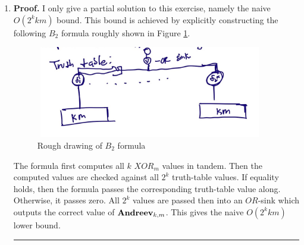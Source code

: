 \documentclass[12pt]{article}%
\newenvironment{proof}[1][Proof]{\textbf{#1.} }{\ \rule{0.5em}{0.5em}}
\begin{document}
\begin{enumerate}
\begin{proof}
\begin{gather*}
  \begin{split}
      \mathcal{L}_{B_2}({\bf Andreev}_{k,m}) & \geq  \frac{1}{4} \sum_{i=1}^{2^k/k} \log |\text{sub}_{V_i}(f)| + \frac{1}{4}\log |\text{sub}_{V_1}(f)| \\
      & \geq \frac{1}{4} \sum_{i=1}^{2^k/k} \log 2^{2^k} + \frac{1}{4}\log 2^k
      =  \frac{2^k2^k}{4k} + \frac{k}{4} = \Omega(n^2/\log n)
  \end{split}
  \end{gather*}
\end{proof}
%
\item
\begin{proof}
  I only give a partial solution to this exercise, namely the naive $O(2^kkm)$ bound. This bound is achieved by explicitly constructing the following $B_2$ formula roughly shown in Figure \ref{fig:cir1}.

  \begin{figure}
    \centering
    \includegraphics[width=10cm, height=4cm]{./Page4.jpeg}
    \caption{Rough drawing of $B_2$ formula}
    \label{fig:cir1}
  \end{figure}
  The formula first computes all $k$ $XOR_m$ values in tandem. Then the computed values are checked against all $2^k$ truth-table values. If equality holds, then the formula passes the corresponding truth-table value along. Otherwise, it passes zero. All $2^k$ values are passed then into an $OR$-sink which outputs the correct value of ${\bf Andreev}_{k,m}$. This gives the naive $O(2^k km)$ lower bound.
\end{proof}

\end{enumerate}
\end{document}
